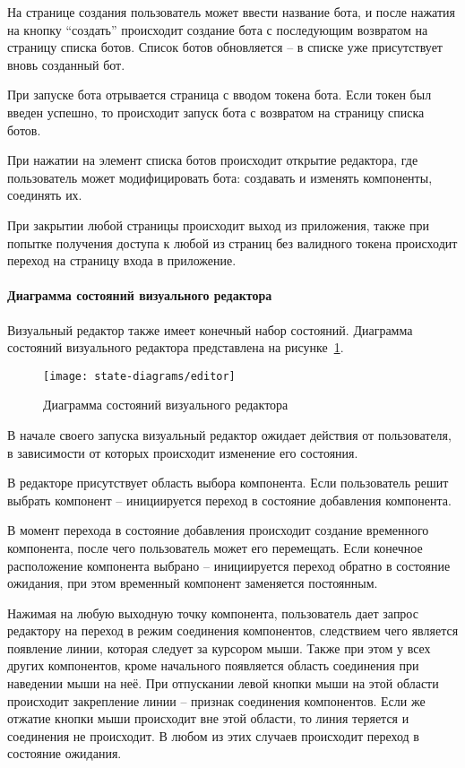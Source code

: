 На странице создания пользователь может ввести название бота, и после
нажатия на кнопку “создать” происходит создание бота с последующим
возвратом на страницу списка ботов. Список ботов обновляется – в списке уже
присутствует вновь созданный бот.

При запуске бота отрывается страница с вводом токена бота. Если токен
был введен успешно, то происходит запуск бота с возвратом на страницу
списка ботов.

При нажатии на элемент списка ботов происходит открытие редактора,
где пользователь может модифицировать бота: создавать и изменять
компоненты, соединять их.

При закрытии любой страницы происходит выход из приложения, также
при попытке получения доступа к любой из страниц без валидного токена
происходит переход на страницу входа в приложение.

\paragraph{Диаграмма состояний визуального редактора}

Визуальный редактор также имеет конечный набор состояний.
Диаграмма состояний визуального редактора представлена на
рисунке~\ref{f:editor-state-diagram}.

\begin{figure}[!ht]
	\centering
	\texttt{[image: state-diagrams/editor]}
	\caption{Диаграмма состояний визуального редактора}
	\label{f:editor-state-diagram}
\end{figure}


В начале своего запуска визуальный редактор ожидает действия от
пользователя, в зависимости от которых происходит изменение его состояния.

В редакторе присутствует область выбора компонента. Если
пользователь решит выбрать компонент – инициируется переход в состояние
добавления компонента.

В момент перехода в состояние добавления происходит создание
временного компонента, после чего пользователь может его перемещать. Если
конечное расположение компонента выбрано – инициируется переход обратно
в состояние ожидания, при этом временный компонент заменяется
постоянным.

Нажимая на любую выходную точку компонента, пользователь дает
запрос редактору на переход в режим соединения компонентов, следствием
чего является появление линии, которая следует за курсором мыши. Также при
этом у всех других компонентов, кроме начального появляется область
соединения при наведении мыши на неё. При отпускании левой кнопки мыши
на этой области происходит закрепление линии – признак соединения
компонентов. Если же отжатие кнопки мыши происходит вне этой области, то
линия теряется и соединения не происходит. В любом из этих случаев
происходит переход в состояние ожидания.

